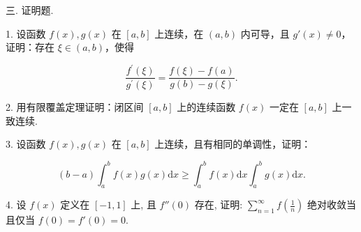 \documentclass{examcollection}
\renewcommand{\displayformula}[1]{\[#1\]}
\begin{document}
{\begin{minipage}{\textwidth}
三. 证明题.\par
1. 设函数 $f(x), g(x)$ 在 $[a, b]$ 上连续，在 $(a, b)$ 内可导，且 $g'(x) \neq 0$，证明：存在 $\xi \in (a, b)$，使得\par
\displayformula{\frac {f ^ {\prime} (\xi)}{g ^ {\prime} (\xi)} = \frac {f (\xi) - f (a)}{g (b) - g (\xi)}.}\par
2. 用有限覆盖定理证明：闭区间 $[a, b]$ 上的连续函数 $f(x)$ 一定在 $[a, b]$ 上一致连续.\par
3. 设函数 $f(x), g(x)$ 在 $[a, b]$ 上连续，且有相同的单调性，证明：\par
\displayformula{(b - a) \int_ {a} ^ {b} f (x) g (x) \mathrm{d} x \geq \int_ {a} ^ {b} f (x) \mathrm{d} x \int_ {a} ^ {b} g (x) \mathrm{d} x.}\par
4. 设 $f(x)$ 定义在 $[-1, 1]$ 上, 且 $f''(0)$ 存在, 证明: $\sum_{n=1}^{\infty} f\left(\frac{1}{n}\right)$ 绝对收敛当且仅当 $f(0) = f'(0) = 0$.\par
\end{minipage}}
\ifdim\dimexpr\ht\proofbox+\dp\proofbox\relax>\textheight
\noindent\resizebox{!}{\textheight}{\usebox{\proofbox}}\else\noindent\usebox{\proofbox}\fi\clearpage
\end{document}
